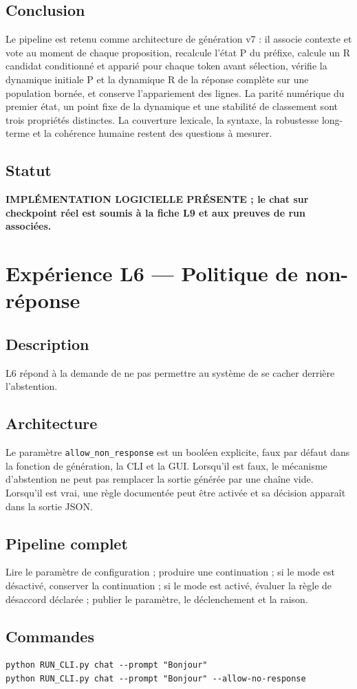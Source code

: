 \documentclass[11pt,a4paper]{report}
\begin{document}
\section{Conclusion}
Le pipeline est retenu comme architecture de génération v7 : il associe contexte et vote au moment de chaque proposition, recalcule l'état P du préfixe, calcule un R candidat conditionné et apparié pour chaque token avant sélection, vérifie la dynamique initiale P et la dynamique R de la réponse complète sur une population bornée, et conserve l'appariement des lignes. La parité numérique du premier état, un point fixe de la dynamique et une stabilité de classement sont trois propriétés distinctes. La couverture lexicale, la syntaxe, la robustesse long-terme et la cohérence humaine restent des questions à mesurer.
\section{Statut}
\textbf{IMPLÉMENTATION LOGICIELLE PRÉSENTE ; le chat sur checkpoint réel est soumis à la fiche L9 et aux preuves de run associées.}

\chapter{Expérience L6 — Politique de non-réponse}
\section{Description}
L6 répond à la demande de ne pas permettre au système de se cacher derrière l'abstention.
\section{Architecture}
Le paramètre \texttt{allow\_non\_response} est un booléen explicite, faux par défaut dans la fonction de génération, la CLI et la GUI. Lorsqu'il est faux, le mécanisme d'abstention ne peut pas remplacer la sortie générée par une chaîne vide. Lorsqu'il est vrai, une règle documentée peut être activée et sa décision apparaît dans la sortie JSON.
\section{Pipeline complet}
Lire le paramètre de configuration ; produire une continuation ; si le mode est désactivé, conserver la continuation ; si le mode est activé, évaluer la règle de désaccord déclarée ; publier le paramètre, le déclenchement et la raison.
\section{Commandes}
\begin{verbatim}
python RUN_CLI.py chat --prompt "Bonjour"
python RUN_CLI.py chat --prompt "Bonjour" --allow-no-response
\end{verbatim}
\end{document}
